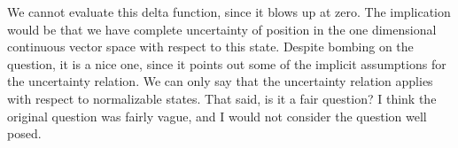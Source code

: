 We cannot evaluate this delta function, since it blows up at zero.  The implication would be that we have complete uncertainty of position in the one dimensional continuous vector space with respect to this state.  Despite bombing on the question, it is a nice one, since it points out some of the implicit assumptions for the uncertainty relation.  We can only say that the uncertainty relation applies with respect to normalizable states.  That said, is it a fair question?  I think the original question was fairly vague, and I would not consider the question well posed.

\EndArticle
